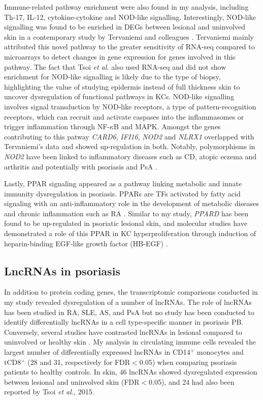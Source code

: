Immune-related pathway enrichment were also found in my analysis, including Th-17, IL-12, cytokine-cytokine and NOD-like signalling. Interestingly, NOD-like signalling was found to be enriched in DEGs between lesional and uninvolved skin in a contemporary study by Tervaniemi and colleagues \parencite{Tervaniemi2016}. Tervaniemi mainly attributed this novel pathway to the greater sensitivity of RNA-seq compared to microarrays to detect changes in gene expression for genes involved in this pathway. The fact that Tsoi \textit{et al.} also used RNA-seq and did not show enrichment for NOD-like signalling is likely due to the type of biopsy, highlighting the value of studying epidermis instead of full thickness skin to uncover dysregulation of functional pathways in KCs. NOD-like signalling involves signal transduction by NOD-like receptors, a type of pattern-recognition receptors, which can recruit and activate caspases into the inflammasomes or trigger inflammation through NF-$\kappa$B and MAPK.  Amongst the genes contributing to this patway \textit{CARD6}, \textit{IFI16}, \textit{NOD2} and \textit{NLRX1} overlapped with Tervaniemi’s data and showed up-regulation in both. Notably, polymorphisms in \textit{NOD2} have been linked to inflammatory diseases such as CD, atopic eczema and arthritis and potentially with psoriasis and PsA \parencite{Zhong2013,Zhu2012}.

Lastly, PPAR signaling appeared as a pathway linking metabolic and innate immunity dysregulation in psoriasis. PPARs are TFs activated by fatty acid signaling with an anti-inflammatory role in the development of metabolic diseases and chronic inflammation such as RA \parencite{Straus2007,Ji2001}. Similar to my study, \textit{PPARD} has been found to be up-regulated in psoriatic lesional skin, and molecular studies have demonstrated a role of this PPAR  in KC hyperproliferation through induction of heparin-binding EGF-like growth factor (HB-EGF) \parencite{Romanowska2008}.

\subsection{LncRNAs in psoriasis}
In addition to protein coding genes, the transcriptomic comparisons conducted in my study revealed dysregulation of a number of lncRNAs. The role of lncRNAs has been studied in RA, SLE, AS, and PsA \parencite{Muller2014,Shi2014,Zhang2017, Dolcino2018} but no study has been conducted to identify differentially lncRNAs in a cell type-specific manner in psoriasis PB. Conversely, several studies have contrasted lncRNAs in lesional compared to uninvolved or healthy skin \parencite{Li2014, Ahn2016, Gupta2016, Tsoi2015}. My analysis in circulating immune cells revealed the largest number of differentially expressed lncRNAs in CD14$^+$ monocytes and tCD8$^+$ (28 and 31, respectively for FDR$<$0.05) when comparing psoriasis patients to healthy controls. In skin, 46 lncRNAs showed dysregulated expression between lesional and uninvolved skin (FDR$<$0.05), and 24 had also been reported by Tsoi \textit{et al.}, 2015.    

